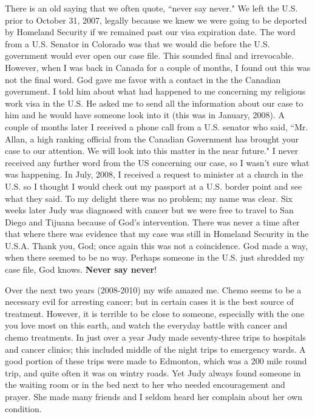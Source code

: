 \documentclass[oneside,12pt]{book}
\begin{document}
There is an old saying that we often quote, ``never say never." We left the U.S. prior to October 31, 2007, legally because we knew we were going to be deported by Homeland Security if we remained past our visa expiration date. The word from a U.S. Senator in Colorado was that we would die before the U.S. government would ever open our case file. This sounded final and irrevocable. However, when I was back in Canada for a couple of months, I found out this was not the final word. God gave me favor with a contact in the the Canadian government. I told him about what had happened to me concerning my religious work visa in the U.S. He asked me to send all the information about our case to him and he would have someone look into it (this was in January, 2008).  A couple of months later I received a phone call from a U.S. senator who said, ``Mr. Allan, a high ranking official from the Canadian Government has brought your case to our attention. We will look into this matter in the near future." I never received any further word from the US concerning our case, so I wasn't sure what was happening. In July, 2008, I received a request to minister at a church in the U.S. so I thought I would check out my passport at a U.S. border point and see what they said. To my delight there was no problem; my name was clear. Six weeks later Judy was diagnosed with cancer but we were free to travel to San Diego and Tijuana because of God's intervention. There was never a time after that where there was evidence that my case was still in Homeland Security in the U.S.A. Thank you, God; once again this was not a coincidence. God made a way, when there seemed to be no way. Perhaps someone in the U.S. just shredded my case file, God knows. \textbf{Never say never}!

Over the next two years (2008-2010) my wife amazed me. Chemo seems to be a necessary evil for arresting cancer; but in certain cases it is the best source of treatment. However, it is terrible to be close to someone, especially with the one you love most on this earth, and watch the everyday battle with cancer and chemo treatments. In just over a year Judy made seventy-three trips to hospitals and cancer clinics; this included middle of the night trips to emergency wards. A good portion of these trips were made to Edmonton, which was a 200 mile round trip, and quite often it was on wintry roads. Yet Judy always found someone in the waiting room or in the bed next to her who needed encouragement and prayer. She made many friends and I seldom heard her complain about her own condition.
\end{document}
